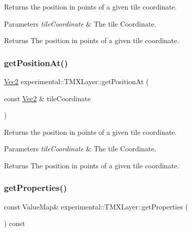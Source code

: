 Returns the position in points of a given tile coordinate.


\begin{DoxyParams}{Parameters}
{\em tile\+Coordinate} & The tile Coordinate. \\
\hline
\end{DoxyParams}
\begin{DoxyReturn}{Returns}
The position in points of a given tile coordinate. 
\end{DoxyReturn}
\mbox{\label{classexperimental_1_1TMXLayer_a9e0fda71c9aa1b09a6715cdc9f3f5f63}} 
\subsubsection{\texorpdfstring{get\+Position\+At()}{getPositionAt()}\hspace{0.1cm}{\footnotesize\ttfamily [2/2]}}
{\footnotesize\ttfamily \hyperlink{classVec2}{Vec2} experimental\+::\+T\+M\+X\+Layer\+::get\+Position\+At (\begin{DoxyParamCaption}\item[{const \hyperlink{classVec2}{Vec2} \&}]{tile\+Coordinate }\end{DoxyParamCaption})}

Returns the position in points of a given tile coordinate.


\begin{DoxyParams}{Parameters}
{\em tile\+Coordinate} & The tile Coordinate. \\
\hline
\end{DoxyParams}
\begin{DoxyReturn}{Returns}
The position in points of a given tile coordinate. 
\end{DoxyReturn}
\mbox{\label{classexperimental_1_1TMXLayer_a1c2e4bb7d2ab4683b6c1d8c784b867bc}} 
\subsubsection{\texorpdfstring{get\+Properties()}{getProperties()}\hspace{0.1cm}{\footnotesize\ttfamily [1/4]}}
{\footnotesize\ttfamily const Value\+Map\& experimental\+::\+T\+M\+X\+Layer\+::get\+Properties (\begin{DoxyParamCaption}{ }\end{DoxyParamCaption}) const\hspace{0.3cm}{\ttfamily [inline]}}

